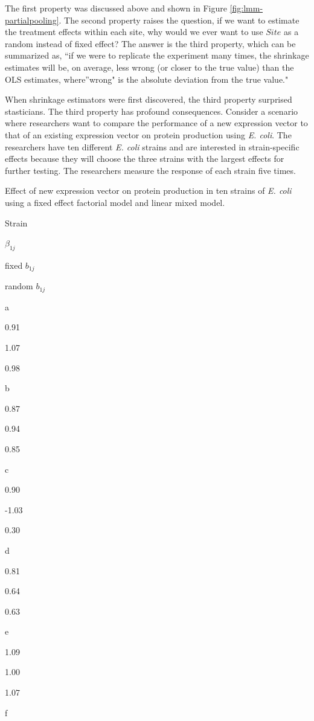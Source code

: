 \documentclass[]{book}
\begin{document}
The first property was discussed above and shown in Figure \ref{fig:lmm-partialpooling}. The second property raises the question, if we want to estimate the treatment effects within each site, why would we ever want to use \(Site\) as a random instead of fixed effect? The answer is the third property, which can be summarized as, ``if we were to replicate the experiment many times, the shrinkage estimates will be, on average, less wrong (or closer to the true value) than the OLS estimates, where''wrong" is the absolute deviation from the true value."

When shrinkage estimators were first discovered, the third property surprised stasticians. The third property has profound consequences. Consider a scenario where researchers want to compare the performance of a new expression vector to that of an existing expression vector on protein production using \emph{E. coli}. The researchers have ten different \emph{E. coli} strains and are interested in strain-specific effects because they will choose the three strains with the largest effects for further testing. The researchers measure the response of each strain five times.

\label{tab:lmm-fish-passage}Effect of new expression vector on protein production in ten strains of \emph{E. coli} using a fixed effect factorial model and linear mixed model.

Strain

\(\beta_{1j}\)

fixed \(b_{1j}\)

random \(b_{1j}\)

a

0.91

1.07

0.98

b

0.87

0.94

0.85

c

0.90

-1.03

0.30

d

0.81

0.64

0.63

e

1.09

1.00

1.07

f
\end{document}
